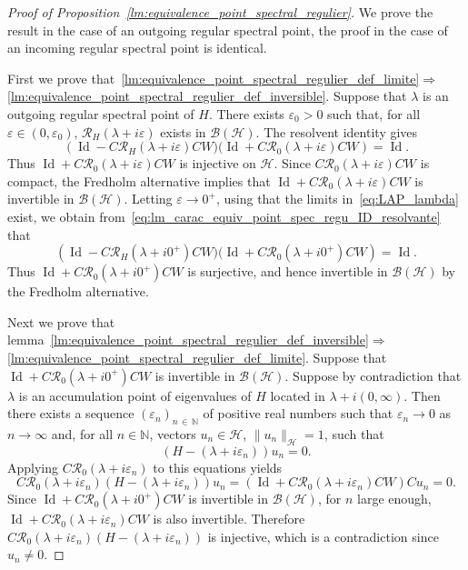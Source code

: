 \documentclass[10pt]{amsart}
\theoremstyle{definition}\newtheorem{defi}[theo]{Definition}\newtheorem{rema}[theo]{Remark}\newtheorem{exam}[theo]{Example}\newtheorem{exem}[theo]{Example}\newtheorem{nota}[theo]{Notation}
\newcommand{\Hi}{\mathcal{H}}
\newcommand{\N}{\mathbb{N}}
\newcommand{\Res}{\mathcal{R}}
\newcommand{\clB}{\mathcal{B}}
\DeclareMathOperator{\Id}{Id}
\begin{document}
\begin{proof}[Proof of Proposition~\ref{lm:equivalence_point_spectral_regulier}]
We prove the result in the case of an outgoing regular spectral point, the proof in the case of an incoming regular spectral point is identical.

First we prove that~\eqref{lm:equivalence_point_spectral_regulier_def_limite}$\Rightarrow$\eqref{lm:equivalence_point_spectral_regulier_def_inversible}. Suppose that $\lambda$ is an outgoing regular spectral point of $H$. There exists $\varepsilon_0>0$ such that, for all $\varepsilon\in(0,\varepsilon_0)$, $\Res_H(\lambda+ i\varepsilon)$ exists in $\clB(\Hi)$. The resolvent identity gives
\begin{equation}\label{eq:lm_carac_equiv_point_spec_regu_ID_resolvante}
\left(\Id-C\Res_H(\lambda+ i\varepsilon)CW)(\Id+C\Res_0(\lambda+ i\varepsilon)CW\right)=\Id.
\end{equation}
Thus $\Id+C\Res_0(\lambda+i\varepsilon)CW$ is injective on $\Hi$. Since $C\Res_0(\lambda+i\varepsilon)CW$ is compact, the Fredholm alternative implies that $\Id+C\Res_0(\lambda+i\varepsilon)CW$ is invertible in $\clB(\Hi)$. Letting $\varepsilon\to0^+$, using that the limits in~\eqref{eq:LAP_lambda} exist, we obtain from~\eqref{eq:lm_carac_equiv_point_spec_regu_ID_resolvante} that
\begin{equation*}
\left(\Id-C\Res_H(\lambda+i0^+)CW)(\Id+C\Res_0(\lambda+i0^+)CW\right)=\Id.
\end{equation*}
Thus $\Id+C\Res_0(\lambda+ i0^+)CW$ is surjective, and hence invertible in $\clB(\Hi)$ by the Fredholm alternative.

Next we prove that lemma~\eqref{lm:equivalence_point_spectral_regulier_def_inversible}$\Rightarrow$\eqref{lm:equivalence_point_spectral_regulier_def_limite}. Suppose that $\Id+C\Res_0(\lambda+ i0^+)CW$ is invertible in $\clB(\Hi)$. Suppose by contradiction that $\lambda$ is an accumulation point of eigenvalues of $H$ located in $\lambda +i(0,\infty)$. Then there exists a sequence $(\varepsilon_n)_{n\,\in\,\N}$ of positive real numbers such that $\varepsilon_n\to0$ as $n\to\infty$ and, for all $n\in\N$, vectors $u_n\in\Hi$, $\|u_n\|_\Hi=1$, such that
\begin{equation*}
(H-(\lambda+ i\varepsilon_n))u_n=0.
\end{equation*}
Applying $C\Res_0(\lambda+ i\varepsilon_n)$ to this equations yields
\begin{equation*}
C\Res_0(\lambda+ i\varepsilon_n)(H-(\lambda+i\varepsilon_n))u_n=(\Id+C\Res_0(\lambda+ i\varepsilon_n)CW)Cu_n=0.
\end{equation*}
Since $\Id+C\Res_0(\lambda+ i0^+)CW$ is invertible in $\clB(\Hi)$, for $n$ large enough, $\Id+C\Res_0(\lambda+ i\varepsilon_n)CW$ is also invertible. Therefore $C\Res_0(\lambda+ i\varepsilon_n)(H-(\lambda+ i\varepsilon_n))$ is injective, which is a contradiction since $u_n\neq 0$.


\end{proof}
\end{document}
